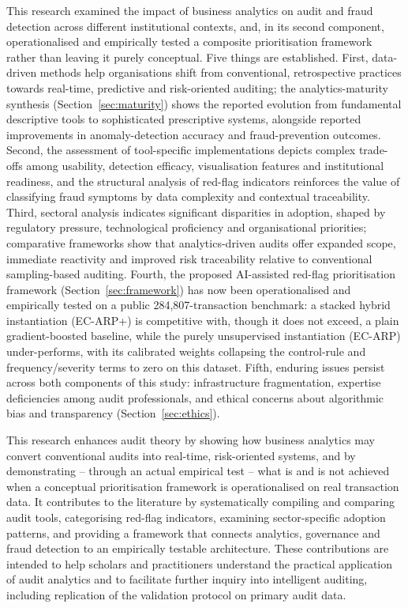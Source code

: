 \documentclass[preprint,12pt]{elsarticle}
\begin{document}
This research examined the impact of business analytics on audit and fraud detection across different institutional contexts, and, in its second component, operationalised and empirically tested a composite prioritisation framework rather than leaving it purely conceptual. Five things are established. First, data-driven methods help organisations shift from conventional, retrospective practices towards real-time, predictive and risk-oriented auditing; the analytics-maturity synthesis (Section~\ref{sec:maturity}) shows the reported evolution from fundamental descriptive tools to sophisticated prescriptive systems, alongside reported improvements in anomaly-detection accuracy and fraud-prevention outcomes. Second, the assessment of tool-specific implementations depicts complex trade-offs among usability, detection efficacy, visualisation features and institutional readiness, and the structural analysis of red-flag indicators reinforces the value of classifying fraud symptoms by data complexity and contextual traceability. Third, sectoral analysis indicates significant disparities in adoption, shaped by regulatory pressure, technological proficiency and organisational priorities; comparative frameworks show that analytics-driven audits offer expanded scope, immediate reactivity and improved risk traceability relative to conventional sampling-based auditing. Fourth, the proposed AI-assisted red-flag prioritisation framework (Section~\ref{sec:framework}) has now been operationalised and empirically tested on a public 284,807-transaction benchmark: a stacked hybrid instantiation (EC-ARP+) is competitive with, though it does not exceed, a plain gradient-boosted baseline, while the purely unsupervised instantiation (EC-ARP) under-performs, with its calibrated weights collapsing the control-rule and frequency/severity terms to zero on this dataset. Fifth, enduring issues persist across both components of this study: infrastructure fragmentation, expertise deficiencies among audit professionals, and ethical concerns about algorithmic bias and transparency (Section~\ref{sec:ethics}).

This research enhances audit theory by showing how business analytics may convert conventional audits into real-time, risk-oriented systems, and by demonstrating -- through an actual empirical test -- what is and is not achieved when a conceptual prioritisation framework is operationalised on real transaction data. It contributes to the literature by systematically compiling and comparing audit tools, categorising red-flag indicators, examining sector-specific adoption patterns, and providing a framework that connects analytics, governance and fraud detection to an empirically testable architecture. These contributions are intended to help scholars and practitioners understand the practical application of audit analytics and to facilitate further inquiry into intelligent auditing, including replication of the validation protocol on primary audit data.
\end{document}
